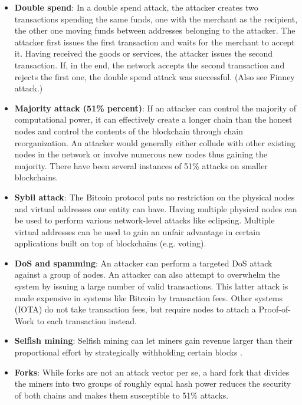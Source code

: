 \documentclass[12pt]{article}
\begin{document}
\begin{itemize}
    \item \textbf{Double spend}: In a double spend attack, the attacker creates two transactions spending the same funds, one with the merchant as the recipient, the other one moving funds between addresses belonging to the attacker. The attacker first issues the first transaction and waits for the merchant to accept it. Having received the goods or services, the attacker issues the second transaction. If, in the end, the network accepts the second transaction and rejects the first one, the double spend attack was successful. (Also see Finney attack.)

    \item \textbf{Majority attack (51\% percent)}: If an attacker can control the majority of computational power, it can effectively create a longer chain than the honest nodes and control the contents of the blockchain through chain reorganization. An attacker would generally either collude with other existing nodes in the network or involve numerous new nodes thus gaining the majority. There have been several instances of 51\% attacks on smaller blockchains.

    \item \textbf{Sybil attack}: The Bitcoin protocol puts no restriction on the physical nodes and virtual addresses one entity can have. Having multiple physical nodes can be used to perform various network-level attacks like eclipsing. Multiple virtual addresses can be used to gain an unfair advantage in certain applications built on top of blockchains (e.g. voting).

    \item \textbf{DoS and spamming}: An attacker can perform a targeted DoS attack against a group of nodes. An attacker can also attempt to overwhelm the system by issuing a large number of valid transactions. This latter attack is made expensive in systems like Bitcoin by transaction fees. Other systems (IOTA) do not take transaction fees, but require nodes to attach a Proof-of-Work to each transaction instead.

    \item \textbf{Selfish mining}: Selfish mining can let miners gain revenue larger than their proportional effort by strategically withholding certain blocks \cite{SelfishMining}.

    \item \textbf{Forks}: While forks are not an attack vector per se, a hard fork that divides the miners into two groups of roughly equal hash power reduces the security of both chains and makes them susceptible to 51\% attacks.
\end{itemize}
\end{document}
